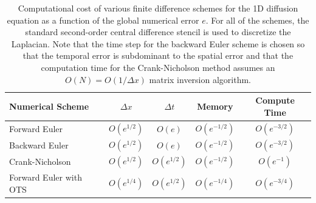 \documentclass[fleqn,12pt,twoside]{article}
\def\dt{\Delta t}
\def\dx{\Delta x}
\begin{document}
\begin{table}[tb]
\caption{
Computational cost of various finite difference schemes for the 1D 
diffusion equation as a function of the global numerical error $e$.
For all of the schemes, the standard second-order central difference 
stencil is used to discretize the Laplacian.  
Note that the time step for the backward Euler scheme is chosen so that the
temporal error is subdominant to the spatial error and that the computation 
time for the Crank-Nicholson method assumes an $O(N) = O \left( 1/\dx\right)$ 
matrix inversion algorithm. 
}
\label{tab:comp_perf_vs_err} 
\renewcommand{\arraystretch}{1.5}
\begin{tabular}{lcccc}
  \hline
  {\bf Numerical Scheme} & $\dx$ 
  & $\dt$
  & {\bf Memory}
  & {\bf Compute Time}
  \\
  \hline 
  Forward Euler    & $O\left( e^{1/2} \right)$ 
                   & $O\left( e \right)$ 
                   & $O\left( e^{-1/2} \right)$ 
                   & $O\left( e^{-3/2} \right)$ \\
  Backward Euler   & $O\left( e^{1/2} \right)$ 
                   & $O\left( e \right)$ 
                   & $O\left( e^{-1/2} \right)$ 
                   & $O\left( e^{-3/2} \right)$ \\
  Crank-Nicholson  & $O\left( e^{1/2} \right)$ 
                   & $O\left( e^{1/2} \right)$ 
                   & $O\left( e^{-1/2} \right)$ 
                   & $O\left( e^{-1} \right)$ \\
  Forward Euler with OTS  & $O\left( e^{1/4} \right)$ 
                   & $O\left( e^{1/2} \right)$ 
                   & $O\left( e^{-1/4} \right)$ 
                   & $O\left( e^{-3/4} \right)$ \\ 
  \hline
\end{tabular}
\end{table}
\end{document}
